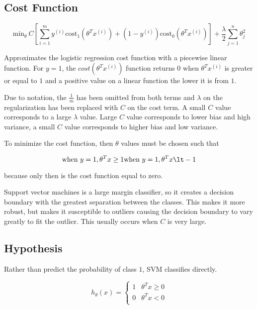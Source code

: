 \documentclass[
]{article}
\author{}
\date{}
\begin{document}
\hypertarget{header-n0}{%
\subsection{Cost Function}\label{header-n0}}

\[\mbox{min}_\theta\ C\left[\sum_{i=1}^{m}y^{(i)}\text{cost}_1(\theta^Tx^{(i)}) + (1-y^{(i)}) \text{cost}_0(\theta^Tx^{(i)})\right]+\frac{\lambda}{2}\sum_{j=1}^n\theta^2_j\]

Approximates the logistic regression cost function with a piecewise
linear function. For \(y=1\), the \(cost(\theta^Tx^{(i)})\) function
returns \(0\) when \(\theta^Tx^{(i)}\) is greater or equal to \(1\) and
a positive value on a linear function the lower it is from \(1\).

Due to notation, the \(\frac{1}{m}\) has been omitted from both terms
and \(\lambda\) on the regularization has been replaced with \(C\) on
the cost term. A small \(C\) value corresponds to a large \(\lambda\)
value. Large \(C\) value corresponds to lower bias and high variance, a
small \(C\) value corresponds to higher bias and low variance.

To minimize the cost function, then \(\theta\) values must be chosen
such that

\[\text{when } y=1, \theta^Tx \ge 1 \\\text{when } y=1, \theta^Tx \lt -1\]

because only then is the cost function equal to zero.

Support vector machines is a large margin classifier, so it creates a
decision boundary with the greatest separation between the classes. This
makes it more robust, but makes it susceptible to outliers causing the
decision boundary to vary greatly to fit the outlier. This usually
occurs when \(C\) is very large.

\hypertarget{header-n9}{%
\subsection{Hypothesis}\label{header-n9}}

Rather than predict the probability of class \(1\), SVM classifies
directly.

\[h_\theta(x) = 
\left\{
\begin{array}{ll}
      1 & \theta^Tx \ge 0 \\
      0 & \theta^Tx \lt 0 \\
\end{array} 
\right.\]
\end{document}
